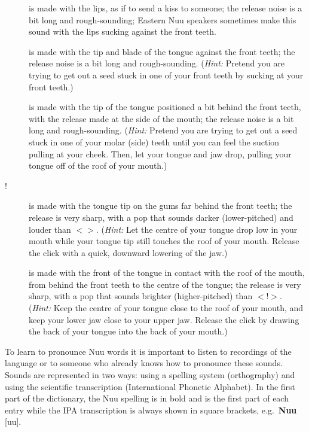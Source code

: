 \begin{description}
\item [] is made with the lips, as if to send a kiss to
    someone; the release noise is a bit long and rough-sounding;
        Eastern N\textipa{\textvertline}uu speakers sometimes make
        this sound with the lips sucking against the front teeth.
\item [\textipa{\textvertline}] is made with the tip and blade of the
    tongue against the front teeth; the release noise is a bit long
        and rough-sounding. (\emph{Hint:} Pretend you are trying to
        get out a seed stuck in one of your front teeth by sucking at
        your front teeth.)
\item [\textipa{\textdoublevertline}] is made with the tip of the
    tongue positioned a bit behind the front teeth, with the release
        made at the side of the mouth; the release noise is a bit long
        and rough-sounding.  (\emph{Hint:} Pretend you are trying to
        get out a seed stuck in one of your molar (side) teeth until
        you can feel the suction pulling at your cheek. Then, let your
        tongue and jaw drop, pulling your tongue off of the roof of
        your mouth.)
\item [!] is made with the tongue tip on the gums far behind the front
    teeth; the release is very sharp, with a pop that sounds darker
        (lower-pitched) and louder than
        $<$\textipa{\textdoublebarpipe}$>$. (\emph{Hint:} Let the
        centre of your tongue drop low in your mouth while your tongue
        tip still touches the roof of your mouth. Release the click
        with a quick, downward lowering of the jaw.)
\item [\textipa{\textdoublebarpipe}] is made with the front of the
    tongue in contact with the roof of the mouth, from behind the
        front teeth to the centre of the tongue; the release is very
        sharp, with a pop that sounds brighter (higher-pitched) than
        $<$!$>$. (\emph{Hint:} Keep the centre of your tongue close to
        the roof of your mouth, and keep your lower jaw close to your
        upper jaw. Release the click by drawing the back of your
        tongue into the back of your mouth.)
\end{description}

To learn to pronounce N\textipa{\textvertline}uu words it is important
to listen to recordings of the language or to someone who already
knows how to pronounce these sounds. Sounds are represented in two
ways: using a spelling system (orthography) and using the scientific
transcription (International Phonetic Alphabet). In the first part of
the dictionary, the N\textipa{\textvertline}uu spelling is in bold and
is the first part of each entry while the IPA transcription is always
shown in square brackets, e.g.\
\textbf{N\textipa{\textvertline}uu}
[uu].\\

